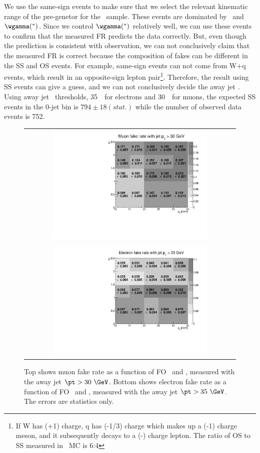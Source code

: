 We use the same-sign events to make sure that we select the 
relevant kinematic range of the pre-genetor for the \Wjets\ sample. 
These events are dominated by \Wjets\ and $\wgamma(^*)$. Since we control $\wgamma(^*)$
relatively well, we can use these events to confirm that the measured 
FR predicts the data correctly. 
But, even though the prediction is consistent with observation, 
we can not conclusively claim that the measured FR is correct 
because the composition of fakes can be different in the SS and OS events. 
For example, same-sign events can not come from W+q events, 
which result in an opposite-sign lepton pair\footnote{If W has (+1) charge, 
q has (-1/3) charge which makes up a (-1) charge meson, and it subsequently decays 
to a (-) charge lepton. The ratio of OS to SS measured in \Wjets\ MC 
is 6:4}. Therefore, the result using SS events can 
give a guess, and we can not conclusively decide the away jet \pt. 
Using away jet \pt\ thresholds, 35~\GeV\ for electrons and 
30~\GeV\ for muons, the expected SS events in the 0-jet bin 
is $794\pm18(stat.)$ while the number of observed data events is 752. 
\begin{figure}[htp] 
\centering 
\begin{tabular}{c} 
\includegraphics[width=0.75\textwidth]{figures/2DFR_Muon_jet30.pdf} \\
\\
\includegraphics[width=0.75\textwidth]{figures/2DFR_Electron_jet35.pdf}
\end{tabular} 
\caption{Top shows muon fake rate as a function of FO \pt\ and \Eta, 
measured with the away jet $\pt>30~\GeV$.  
Bottom shows electron fake rate as a function of FO \pt\ and \Eta,
measured with the away jet $\pt>35~\GeV$.
The errors are statistics only.
}
\label{fig:2DFR} 
\end{figure} 


